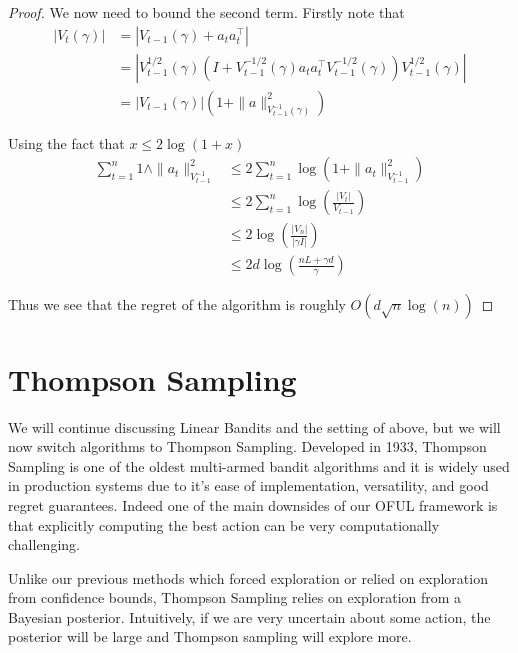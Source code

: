 \documentclass[11pt]{article}
\newcommand{\1}[1]{\mathbf{1}\left\{#1\right\}}
\begin{document}
\begin{proof}
We now need to bound the second term. Firstly note that 
\begin{align*}
|V_t(\gamma)| &= 
|V_{t-1}(\gamma) + a_{t} a_{t}^{\top}| \\
&= |V_{t-1}^{1/2}(\gamma)(I + V_{t-1}^{-1/2}(\gamma)a_ta_t^{\top} V_{t-1}^{-1/2}(\gamma))V_{t-1}^{1/2}(\gamma)|\\
&= |V_{t-1}(\gamma)|(1 + \|a\|^2_{V_{t-1}^{-1}(\gamma)})
\end{align*}


Using the fact that $x \leq 2\log(1+x)$
\begin{align*}
    \sum_{t=1}^n 1\wedge\|a_t\|^2_{V_{t-1}^{-1}} 
    &\leq 2\sum_{t=1}^n \log(1+\|a_t\|^2_{V_{t-1}^{-1}} )\\
    &\leq 2\sum_{t=1}^n \log(\frac{|V_{t}|}{V_{t-1}})\\
    &\leq 2\log(\frac{|V_{n}|}{|\gamma I|})\\
    &\leq 2d\log\left(\frac{n L + \gamma d}{\gamma}\right)
\end{align*}

Thus we see that the regret of the algorithm is roughly $O(d\sqrt{n} \log(n))$
\end{proof}

\section{Thompson Sampling}

We will continue discussing Linear Bandits and the setting of above, but we will now switch algorithms to Thompson Sampling. Developed in 1933, Thompson Sampling is one of the oldest multi-armed bandit algorithms and it is widely used in production systems due to it's ease of implementation, versatility, and good regret guarantees. Indeed one of the main downsides of our OFUL framework is that explicitly computing the best action can be very computationally challenging.



Unlike our previous methods which forced exploration or relied on exploration from confidence bounds, Thompson Sampling relies on exploration from a Bayesian posterior. Intuitively, if we are very uncertain about some action, the posterior will be large and Thompson sampling will explore more.
\end{document}
